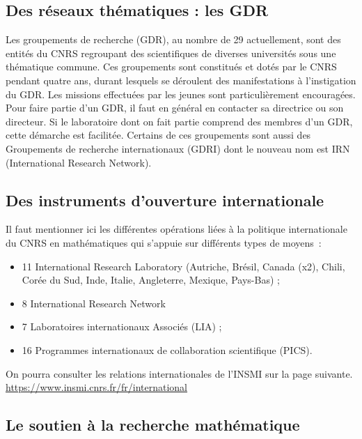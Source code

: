 \subsection{Des r\'eseaux th\'ematiques : les GDR} Les groupements de recherche
(GDR), au nombre de 29 actuellement, sont des entit\'es du CNRS
regroupant des scientifiques de diverses universit\'es sous une
th\'ematique commune. Ces groupements sont constitu\'es et dot\'es
par le CNRS pendant quatre ans, durant lesquels se d\'eroulent des
manifestations \`a l'instigation du GDR. Les missions effectu\'ees par
les jeunes sont particuli\`erement encourag\'ees. Pour faire partie
d'un GDR, il faut en g\'en\'eral en contacter sa directrice ou son directeur. Si le
laboratoire dont on fait partie comprend des membres d'un GDR, cette
d\'emarche est facilit\'ee. Certains de ces groupements sont aussi des
Groupements de recherche internationaux (GDRI) dont le nouveau nom est
IRN (International Research Network).

\subsection{Des instruments d'ouverture internationale}

Il faut mentionner ici les diff\'erentes op\'erations li\'ees \`a la
politique internationale du CNRS en ma\-th\'e\-ma\-tiques qui
s'appuie sur diff\'erents types de moyens~:
\begin{itemize}
\item 11 International Research Laboratory (Autriche, Br\'esil, Canada (x2), Chili, Cor\'ee du Sud, Inde, Italie, Angleterre, Mexique, Pays-Bas) ;
\item 8 International Research Network
\item 7 Laboratoires internationaux Associ\'es (LIA) ;
\item 16 Programmes internationaux de collaboration scientifique  (PICS).
\end{itemize}

On pourra consulter les relations internationales de l'INSMI sur la page suivante.\\
\url{https://www.insmi.cnrs.fr/fr/international}



\subsection{Le soutien \`a la recherche math\'ematique}

